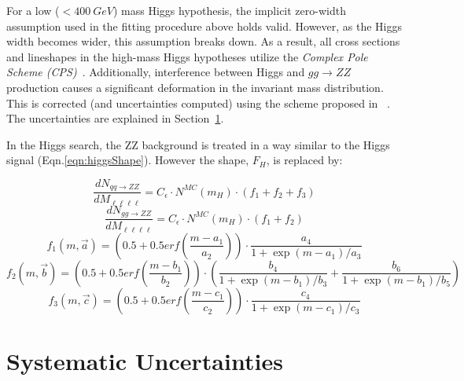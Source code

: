 For a low ($< 400~GeV$) mass Higgs hypothesis, the implicit zero-width
assumption used in the fitting procedure above holds valid. However, as the
Higgs width becomes wider, this assumption breaks down. As a result, all cross
sections and lineshapes in the high-mass Higgs hypotheses utilize the
\emph{Complex Pole Scheme (CPS)}~\cite{higgsLineshape}. Additionally,
interference between Higgs and $gg\rightarrow ZZ$ production causes a significant
deformation in the invariant mass distribution. This is corrected (and
uncertainties computed) using the scheme proposed in
~\cite{higgsHighMassInterference}. The uncertainties are explained in
Section~\ref{sec:systematics}.

In the Higgs search, the ZZ background is treated in a way similar to the Higgs
signal (Eqn.\ref{eqn:higgsShape}). However the shape, $F_H$, is replaced by:

\begin{equation*}
    \frac{dN_{qq\rightarrow ZZ}}{dM_{\ell\ell\ell\ell}} = C_{\epsilon} \cdot N^{MC}(m_H)
        \cdot ( f_1 + f_2 + f_3 )
\end{equation*}
\begin{equation*}
    \frac{dN_{gg\rightarrow ZZ}}{dM_{\ell\ell\ell\ell}} = C_{\epsilon} \cdot N^{MC}(m_H)
        \cdot ( f_1 + f_2 )
\end{equation*}
\begin{equation*}
    f_1(m, \vec{a}) = \left(0.5 + 0.5
        erf(\frac{m-a_1}{a_2}) \right ) \cdot \frac{a_4}{1+\exp{(m-a_1)/a_3}}
\end{equation*}
\begin{equation*}
    f_2(m, \vec{b}) = \left(0.5 + 0.5
        erf(\frac{m-b_1}{b_2}) \right ) \cdot \left (
        \frac{b_4}{1+\exp{(m-b_1)/b_3}} + \frac{b_6}{1+\exp{(m-b_1)/b_5}}
        \right)
\end{equation*}
\begin{equation}
    f_3(m, \vec{c}) = \left(0.5 + 0.5
        erf(\frac{m-c_1}{c_2}) \right ) \cdot \frac{c_4}{1+\exp{(m-c_1)/c_3}}
\end{equation}

\section{Systematic Uncertainties}
\label{sec:systematics}

